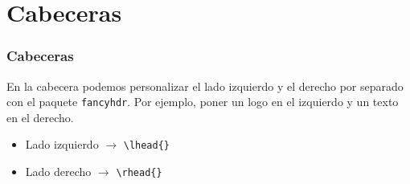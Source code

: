 \section{Cabeceras}

\begin{frame}[fragile]
\frametitle{Cabeceras}
En la cabecera podemos personalizar el lado izquierdo y el derecho por separado con el paquete \verb|fancyhdr|. Por ejemplo, poner un logo en el izquierdo y un texto en el derecho.
\begin{itemize}
    \item Lado izquierdo $\rightarrow$ \verb|\lhead{}|
    \item Lado derecho $\rightarrow$ \verb|\rhead{}|
\end{itemize}
\end{frame}